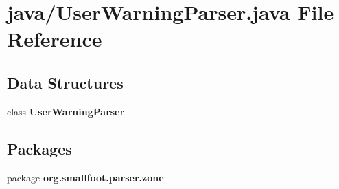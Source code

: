 \section{java/\+User\+Warning\+Parser.java File Reference}
\label{UserWarningParser_8java}
\subsection*{Data Structures}
\begin{DoxyCompactItemize}
\item 
class {\bf User\+Warning\+Parser}
\end{DoxyCompactItemize}
\subsection*{Packages}
\begin{DoxyCompactItemize}
\item 
package {\bf org.\+smallfoot.\+parser.\+zone}
\end{DoxyCompactItemize}
